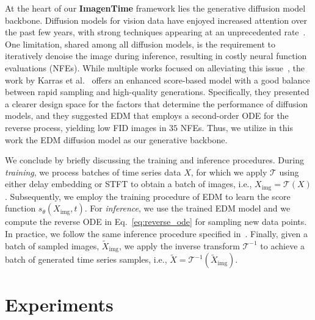 \documentclass{article}
\begin{document}
At the heart of our \textbf{ImagenTime} framework lies the generative diffusion model backbone. Diffusion models for vision data have enjoyed increased attention over the past few years, with strong techniques appearing at an unprecedented rate~\cite{sohl2015deep, song2019generative, ho2020denoising, song2020improved, song2021scorebased, rombach2022high}. One limitation, shared among all diffusion models, is the requirement to iteratively denoise the image during inference, resulting in costly neural function evaluations (NFEs). While multiple works focused on alleviating this issue~\cite{salimans2022progressive, song2023consistency, geng2024one, song2024improved}, the work by Karras et al.~\cite{karras2022elucidating} offers an enhanced score-based model with a good balance between rapid sampling and high-quality generations. Specifically, they presented a clearer design space for the factors that determine the performance of diffusion models, and they suggested EDM that employs a second-order ODE for the reverse process, yielding low FID images in $35$ NFEs. Thus, we utilize in this work the EDM diffusion model as our generative backbone. 


We conclude by briefly discussing the training and inference procedures. During \emph{training}, we process batches of time series data $X$, for which we apply $\mathcal{T}$ using either delay embedding or STFT to obtain a batch of images, i.e., $X_\text{img} = \mathcal{T}(X)$. Subsequently, we employ the training procedure of EDM to learn the score function $s_\theta(X_\text{img}, t)$. For \emph{inference}, we use the trained EDM model and we compute the reverse ODE in Eq.~\eqref{eq:reverse_ode} for sampling new data points. In practice, we follow the same inference procedure specified in~\cite{karras2022elucidating}. Finally, given a batch of sampled images, $\tilde{X}_\text{img}$, we apply the inverse transform $\mathcal{T}^{-1}$ to achieve a batch of generated time series samples, i.e., $\tilde{X} = \mathcal{T}^{-1}(\tilde{X}_\text{img})$.


\section{Experiments}
\end{document}
